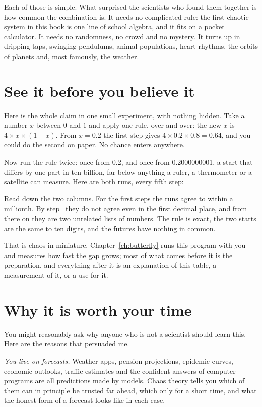 Each of those is simple. What surprised the scientists who found them
together is how common the combination is. It needs no complicated rule:
the first chaotic system in this book is one line of school algebra, and it
fits on a pocket calculator. It needs no randomness, no crowd and no
mystery. It turns up in dripping taps, swinging pendulums, animal
populations, heart rhythms, the orbits of planets and, most famously, the
weather.

\section*{See it before you believe it}

Here is the whole claim in one small experiment, with nothing hidden. Take a
number $x$ between $0$ and $1$ and apply one rule, over and over: the new $x$
is $4 \times x \times (1 - x)$. From $x = \num{0.2}$ the first step gives
$4 \times \num{0.2} \times \num{0.8} = \num{0.64}$, and you could do the
second on paper. No chance enters anywhere.

Now run the rule twice: once from \num{0.2}, and once from
\num{0.2000000001}, a start that differs by one part in ten billion, far
below anything a ruler, a thermometer or a satellite can measure. Here are
both runs, every fifth step:


\noindent
Read down the two columns. For the first  steps the
runs agree to within a millionth. By step~ they do not
agree even in the first decimal place, and from there on they are two
unrelated lists of numbers. The rule is exact, the two starts are the same to
ten digits, and the futures have nothing in common.

That is chaos in miniature. Chapter~\ref{ch:butterfly} runs this program with
you and measures how fast the gap grows; most of what comes before it is the
preparation, and everything after it is an explanation of this table, a
measurement of it, or a use for it.

\section*{Why it is worth your time}

You might reasonably ask why anyone who is not a scientist should learn
this. Here are the reasons that persuaded me.

\emph{You live on forecasts.} Weather apps, pension projections, epidemic
curves, economic outlooks, traffic estimates and the confident answers of
computer programs are all predictions made by models. Chaos theory tells you
which of them can in principle be trusted far ahead, which only for a short
time, and what the honest form of a forecast looks like in each case.

